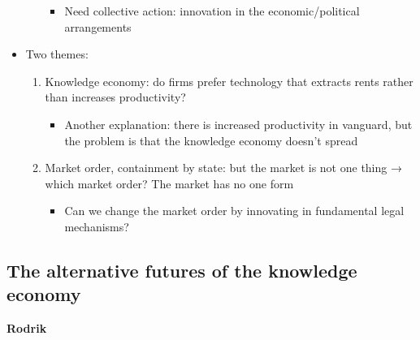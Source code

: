 \begin{itemize}
\begin{enumerate}
    \begin{itemize}
    \tightlist
    \item
      Need collective action: innovation in the economic/political
      arrangements
    \end{itemize}
  \end{enumerate}
\item
  Two themes:

  \begin{enumerate}
  \def\labelenumi{\arabic{enumi}.}
  \tightlist
  \item
    Knowledge economy: do firms prefer technology that extracts rents
    rather than increases productivity?

    \begin{itemize}
    \tightlist
    \item
      Another explanation: there is increased productivity in vanguard,
      but the problem is that the knowledge economy doesn't spread
    \end{itemize}
  \item
    Market order, containment by state: but the market is not one thing
    → which market order? The market has no one form

    \begin{itemize}
    \tightlist
    \item
      Can we change the market order by innovating in fundamental legal
      mechanisms?
    \end{itemize}
  \end{enumerate}
\end{itemize}

\hypertarget{the-alternative-futures-of-the-knowledge-economy}{%
\subsection{The alternative futures of the knowledge
economy}\label{the-alternative-futures-of-the-knowledge-economy}}

\textbf{Rodrik}

